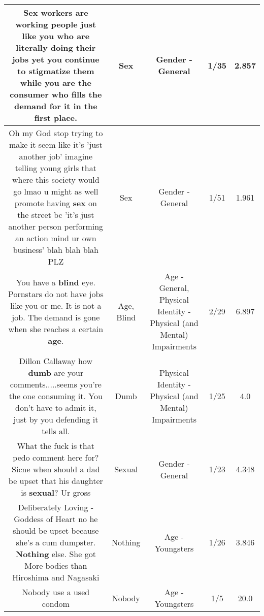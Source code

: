 \documentclass[11pt]{article}
\newlength\mylength
\begin{document}
\begin{center}
\begin{longtable}{|C{.65\mylength}|C{.30\mylength}|C{.12\mylength}|C{.12\mylength}|C{.12\mylength}|}
  \small Sex workers are working people just like you who are literally doing their jobs yet you continue to stigmatize them while you are the consumer who fills the demand for it in the first place.\normalsize   & Sex & Gender - General & 1/35 & 2.857 \\  \hline
  \small Oh my God stop trying to make it seem like it's 'just another job' imagine telling young girls that where this society would go lmao u might as well promote having \textbf{sex} on the street bc 'it's just another person performing an action mind ur own business' blah blah blah PLZ\normalsize   & Sex & Gender - General & 1/51 & 1.961 \\  \hline
  \small You have a \textbf{blind} eye. Pornstars do not have jobs like you or me. It is not a job. The demand is gone when she reaches a certain \textbf{age}.\normalsize   & Age, Blind & Age - General, Physical Identity - Physical (and Mental) Impairments & 2/29 & 6.897 \\  \hline
  \small Dillon Callaway how \textbf{dumb} are your comments.....seems you're the one consuming it. You don't have to admit it, just by you defending it tells all.\normalsize   & Dumb & Physical Identity - Physical (and Mental) Impairments & 1/25 & 4.0 \\  \hline
  \small What the fuck is that pedo comment here for? Sicne when should a dad be upset that his daughter is \textbf{sexual}? Ur gross\normalsize   & Sexual & Gender - General & 1/23 & 4.348 \\  \hline
  \small Deliberately Loving - Goddess of Heart no he should be upset because she's a cum dumpster. \textbf{Nothing} else. She got More bodies than Hiroshima and Nagasaki\normalsize   & Nothing & Age - Youngsters & 1/26 & 3.846 \\  \hline
  \small Nobody use a used condom\normalsize   & Nobody & Age - Youngsters & 1/5 & 20.0 \\  \hline

\end{longtable}
\end{center}
\end{document}
